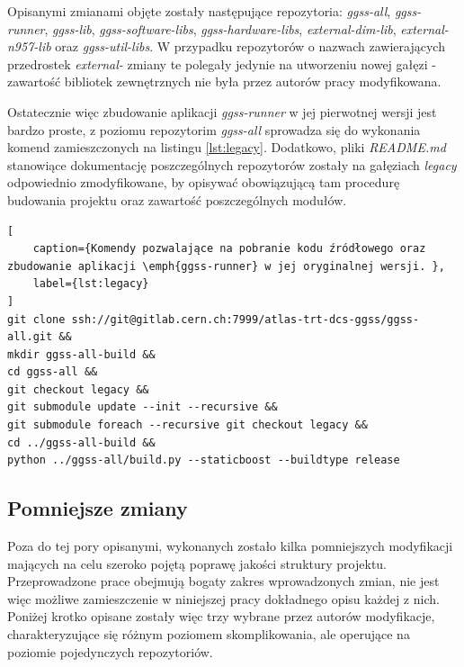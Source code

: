 Opisanymi zmianami objęte zostały następujące repozytoria: \emph{ggss-all}, \emph{ggss-runner}, \emph{ggss-lib}, \emph{ggss-software-libs}, \emph{ggss-hardware-libs}, \emph{external-dim-lib}, \emph{external-n957-lib} oraz \emph{ggss-util-libs}. W przypadku repozytorów o nazwach zawierających przedrostek \emph{external-} zmiany te polegały jedynie na utworzeniu nowej gałęzi - zawartość bibliotek zewnętrznych nie była przez autorów pracy modyfikowana.

Ostatecznie więc zbudowanie aplikacji \emph{ggss-runner} w jej pierwotnej wersji jest bardzo proste, z poziomu repozytorim \emph{ggss-all} sprowadza się do wykonania komend zamieszczonych na listingu \ref{lst:legacy}. Dodatkowo, pliki \emph{README.md} stanowiące dokumentację poszczególnych repozytorów zostały na gałęziach \emph{legacy} odpowiednio zmodyfikowane, by opisywać obowiązującą tam procedurę budowania projektu oraz zawartość poszczególnych modułów.

\begin{lstlisting}[
    caption={Komendy pozwalające na pobranie kodu źródłowego oraz zbudowanie aplikacji \emph{ggss-runner} w jej oryginalnej wersji. },
    label={lst:legacy}
]
git clone ssh://git@gitlab.cern.ch:7999/atlas-trt-dcs-ggss/ggss-all.git &&
mkdir ggss-all-build &&
cd ggss-all &&
git checkout legacy &&
git submodule update --init --recursive &&
git submodule foreach --recursive git checkout legacy &&
cd ../ggss-all-build &&
python ../ggss-all/build.py --staticboost --buildtype release
\end{lstlisting}

\subsection{Pomniejsze zmiany}
Poza do tej pory opisanymi, wykonanych zostało kilka pomniejszych modyfikacji mających na celu szeroko pojętą poprawę jakości struktury projektu. Przeprowadzone prace obejmują bogaty zakres wprowadzonych zmian, nie jest więc możliwe zamieszczenie w niniejszej pracy dokładnego opisu każdej z nich. Poniżej krotko opisane zostały więc trzy wybrane przez autorów modyfikacje, charakteryzujące się różnym poziomem skomplikowania, ale operujące na poziomie pojedynczych repozytoriów. 

